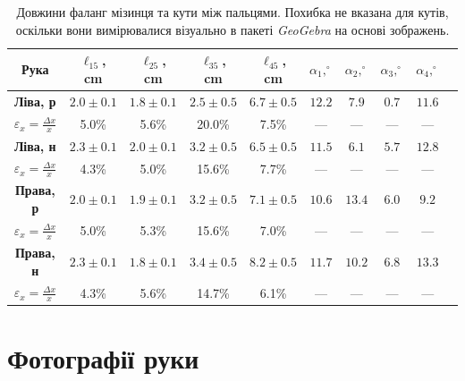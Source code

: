 \documentclass{hw_template}
\begin{document}
\begin{table}[H]
    \centering
    \begin{tabular}{c:ccccccccc}
        \hline
        \textbf{Рука} & \textbf{$\ell_{15}$, cm} & \textbf{$\ell_{25}$, cm} & \textbf{$\ell_{35}$, cm} & \textbf{$\ell_{45}$, cm} & $\alpha_1,^\circ$ & $\alpha_2,^\circ$ & $\alpha_3,^\circ$ & $\alpha_4,^\circ$ \\
        \hline
        \textbf{Ліва, р} & $2.0 \pm 0.1$ & $1.8 \pm 0.1$ & $2.5 \pm 0.5$ & $6.7 \pm 0.5$ & $12.2$ & $7.9$ & $0.7$ & $11.6$ \\
        $\varepsilon_x = \frac{\Delta x}{x}$ & 5.0\% & 5.6\% & 20.0\% & 7.5\% & --- & --- & --- & ---  \\
        \hdashline
        \textbf{Ліва, н} & $2.3 \pm 0.1$ & $2.0 \pm 0.1$ & $3.2 \pm 0.5$ & $6.5 \pm 0.5$ & $11.5$ & $6.1$ & $5.7$ & $12.8$ \\
        $\varepsilon_x = \frac{\Delta x}{x}$ & 4.3\% & 5.0\% & 15.6\% & 7.7\% & --- & --- & --- & --- \\
        \hdashline
        \textbf{Права, р} & $2.0 \pm 0.1$ & $1.9 \pm 0.1$ & $3.2 \pm 0.5$ & $7.1 \pm 0.5$ & $10.6$ & $13.4$ & $6.0$ & $9.2$ \\
        $\varepsilon_x = \frac{\Delta x}{x}$ & 5.0\% & 5.3\% & 15.6\% & 7.0\% & --- & --- & --- & --- \\
        \hdashline
        \textbf{Права, н} & $2.3 \pm 0.1$ & $1.8 \pm 0.1$ & $3.4 \pm 0.5$ & $8.2 \pm 0.5$ & $11.7$ & $10.2$ & $6.8$ & $13.3$ \\
        $\varepsilon_x = \frac{\Delta x}{x}$ & 4.3\% & 5.6\% & 14.7\% & 6.1\% & --- & --- & --- & --- \\
        \hline
    \end{tabular}
    \caption{Довжини фаланг мізинця та кути між пальцями. Похибка не вказана для
    кутів, оскільки вони вимірювалися візуально в пакеті \textit{GeoGebra} на основі зображень.}
\end{table}

\newpage
\section{Фотографії руки}
\end{document}
